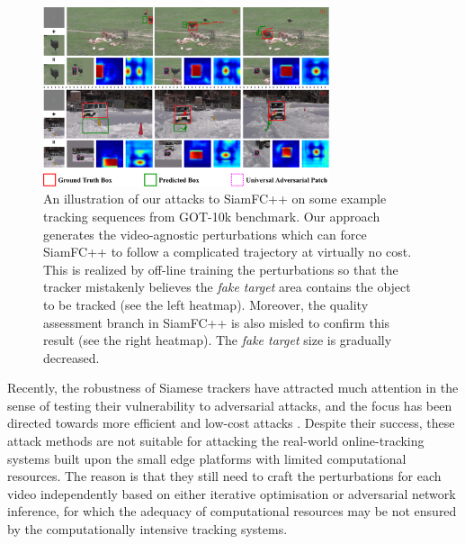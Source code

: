 \documentclass[journal]{IEEEtran}
\begin{document}
\begin{figure}[t]
  \centering
  \includegraphics[width=0.75\textwidth]{images/1_v8.pdf}
  \caption{An illustration of our attacks to SiamFC++ on some example tracking sequences from GOT-10k benchmark. Our approach generates the video-agnostic perturbations which can force SiamFC++ to follow a complicated trajectory at virtually no cost. This is realized by off-line training the perturbations so that the tracker mistakenly believes the \textit{fake target} area contains the object to be tracked (see the left heatmap). Moreover, the quality assessment branch in SiamFC++ is also misled to confirm this result (see the right heatmap). The \textit{fake target} size is gradually decreased.} 
  \label{fig:1}
\end{figure}

Recently, the robustness of Siamese trackers have attracted much attention in the sense of testing their vulnerability to adversarial attacks, and the focus has been directed towards more efficient and low-cost attacks \cite{TTP,FAN,SPARK}. Despite their success, these attack methods are not suitable for attacking the real-world online-tracking systems built upon the small edge platforms with limited computational resources. The reason is that they still need to craft the perturbations for each video independently based on either iterative optimisation or adversarial network inference, for which the adequacy of computational resources may be not ensured by the computationally intensive tracking systems. 
\end{document}
